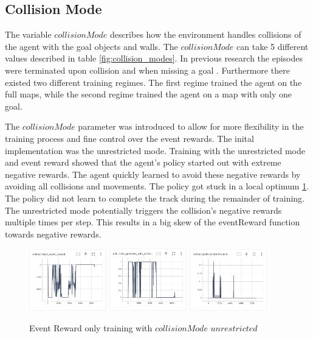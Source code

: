 \subsection{Collision Mode}

The variable $collisionMode$ describes how the environment handles collisions of the agent with the goal objects and walls. The $collisionMode$ can take 5 different values described in table \ref{fig:collision_modes}. In previous research the episodes were terminated upon collision and when missing a goal \textcite{maximilian}. Furthermore there existed two different training regimes. The first regime trained the agent on the full maps, while the second regime trained the agent on a map with only one goal.

The $collisionMode$ parameter was introduced to allow for more flexibility in the training process and fine control over the event rewards. The inital implementation was the unrestricted mode. Training with the unrestricted mode and event reward showed that the agent's policy started out with extreme negative rewards. The agent quickly learned to avoid these negative rewards by avoiding all collisions and movements. The policy got stuck in a local optimum \ref{fig:event_reward_only_collisionModeUnrestricted_event_reward}. The policy did not learn to complete the track during the remainder of training. The unrestricted mode potentially triggers the collision's negative rewards multiple times per step. This results in a big skew of the eventReward function towards negative rewards.

\begin{figure}
    \centering
    \includegraphics[width=0.3\textwidth]{Bilder/tensorboard_images/eventRewardOnly_collisionModeUnrestricted_eventReward.png}
    \includegraphics[width=0.3\textwidth]{Bilder/tensorboard_images/eventRewardOnly_collisionModeUnrestricted_collisionRate.png}
    \includegraphics[width=0.3\textwidth]{Bilder/tensorboard_images/eventRewardOnly_collisionModeUnrestricted_goalCompletionRate.png}
    \caption{Event Reward only training with $collisionMode$ $unrestricted$}
    \label{fig:event_reward_only_collisionModeUnrestricted_event_reward}
\end{figure}

